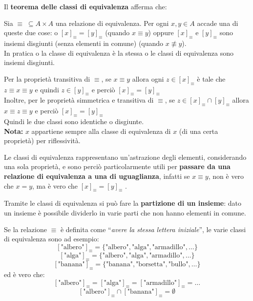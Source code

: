 \documentclass[
  a4paper,
]{article}
\begin{document}
Il \textbf{teorema delle classi di equivalenza} afferma che:

Sia \(\equiv \; \subseteq A \times A\) una relazione di equivalenza. Per
ogni \(x, y \in A\) accade una di queste due cose: o
\([x]_\equiv = [y]_\equiv\) (quando \(x \equiv y\)) oppure
\([x]_\equiv\) e \([y]_\equiv\) sono insiemi disgiunti (senza elementi
in comune) (quando \(x \not \equiv y\)).\\
In pratica o la classe di equivalenza è la stessa o le classi di
equivalenza sono insiemi disgiunti.

\begin{examplebox}[Dimostrazione]

Per la proprietà transitiva di \(\equiv\), se \(x \equiv y\) allora ogni
\(z \in [x]_\equiv\) è tale che \(z \equiv x \equiv y\) e quindi
\(z \in [y]_\equiv\) e perciò \([x]_\equiv = [y]_\equiv\)\\
Inoltre, per le proprietà simmetrica e transitiva di \(\equiv\), se
\(z \in [x]_\equiv \cap [y]_\equiv\) allora \(x \equiv z \equiv y\) e
perciò \([x]_\equiv = [y]_\equiv\)\\
Quindi le due classi sono identiche o disgiunte.\\
\textbf{Nota:} \(x\) appartiene sempre alla classe di equivalenza di
\(x\) (di una certa proprietà) per riflessività.

\end{examplebox}

Le classi di equivalenza rappresentano un'astrazione degli elementi,
considerando una sola proprietà, e sono perciò particolarmente utili per
\textbf{passare da una relazione di equivalenza a una di uguaglianza},
infatti se \(x \equiv y\), non è vero che \(x = y\), ma è vero che
\([x]_\equiv = [y]_\equiv\) .

Tramite le classi di equivalenza si può fare la \textbf{partizione di un
insieme}: dato un insieme è possibile dividerlo in varie parti che non
hanno elementi in comune.

\begin{examplebox}

Se la relazione \(\equiv\) è definita come ``\emph{avere la stessa
lettera iniziale}'', le varie classi di equivalenza sono ad esempio: \[
[\text{"albero"}]_\equiv = \{\text{"albero"}, \text{"alga"}, \text{"armadillo"}, \dots \}
\] \[
[\text{"alga"}]_\equiv = \{\text{"albero"}, \text{"alga"}, \text{"armadillo"}, \dots \}
\] \[
[\text{"banana"}]_\equiv = \{\text{"banana"}, \text{"borsetta"}, \text{"bullo"}, \dots\}
\] ed è vero che: \[
[\text{"albero"}]_\equiv = [\text{"alga"}]_\equiv = [\text{"armadillo"}]_\equiv = \dots
\] \[
[\text{"albero"}]_\equiv \cap [\text{"banana"}]_\equiv = \emptyset
\]

\end{examplebox}
\end{document}
